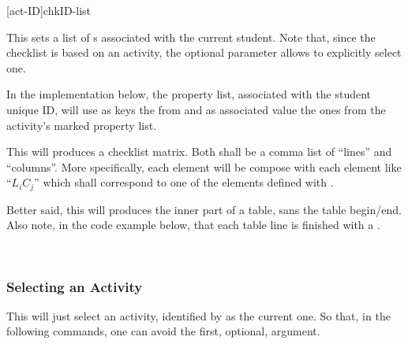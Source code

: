 \documentclass[10pt]{article}
\begin{document}

\begin{codedescribe}{\checklist}
\begin{codesyntax}
  \tsmacro{\checklist}[act-ID]{chkID-list}
\end{codesyntax}
  This sets a list of s associated with the current student. Note that, since the checklist is based on an activity, the optional parameter allows to explicitly select one.
\end{codedescribe}
\begin{tsremark}
  In the implementation below, the property list, associated with the student unique ID, will use as keys the  from \tsobj{\checkdef} and as associated value the ones from the activity's marked property list.
\end{tsremark}



\begin{codedescribe}{\StudentCheckListTable}
\begin{codesyntax}
\end{codesyntax}
  This will produces a checklist matrix. Both  shall be a comma list of ``lines'' and ``columns''. More specifically, each  element will be compose with each  element like ``$L_iC_j$'' which shall correspond to one of the  elements defined with \tsobj{\checkdef}.
\end{codedescribe}
\begin{tsremark}
  Better said, this will produces the inner part of a table, sans the table begin/end. Also note, in the code example below, that each table line is finished with a \tsobj[verb]{\\*}.
\end{tsremark}





~

\subsubsection{Selecting an Activity}

\begin{codedescribe}{\ActivitySelect}
  \begin{codesyntax}
  \end{codesyntax}
  This will just select an activity, identified by  as the current one. So that, in the following commands, one can avoid the first, optional, argument.
\end{codedescribe}
\end{document}
